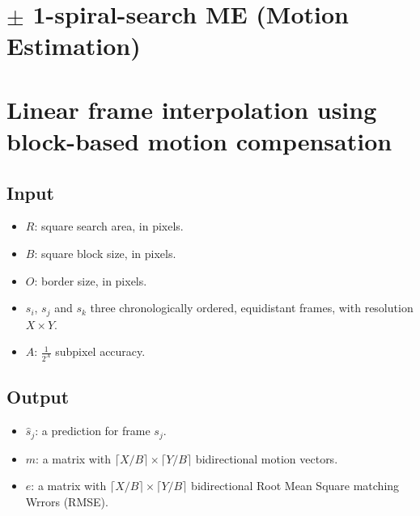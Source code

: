 
\section{$\pm$ 1-spiral-search ME (Motion Estimation)}

\section{Linear frame interpolation using block-based motion compensation}
\label{sec:linear_frame_interpolation}

\subsection{Input}
\begin{itemize}
\tightlist
\item
  $R$: square search area, in pixels.
\item
  $B$: square block size, in pixels.
\item
  $O$: border size, in pixels.
\item
  $s_i$, $s_j$ and $s_k$ three chronologically ordered,
  equidistant frames, with resolution $X\times Y$.
\item
  $A$: $\frac{1}{2^A}$ subpixel accuracy.
\end{itemize}

\subsection{Output}
\begin{itemize}
\tightlist
\item
  $\hat{s}_j$: a prediction for frame $s_j$.
\item
  $m$: a matrix with $\lceil X/B\rceil \times \lceil Y/B\rceil$
  bidirectional motion vectors.
\item
  $e$: a matrix with $\lceil X/B\rceil \times \lceil Y/B\rceil$
  bidirectional Root Mean Square matching Wrrors (RMSE).
\end{itemize}

